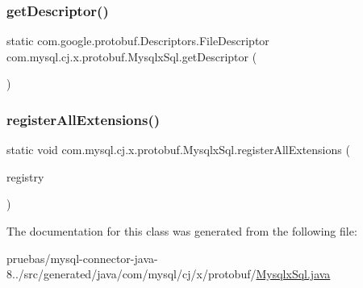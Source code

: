 \subsubsection{\texorpdfstring{get\+Descriptor()}{getDescriptor()}}
{\footnotesize\ttfamily static com.\+google.\+protobuf.\+Descriptors.\+File\+Descriptor com.\+mysql.\+cj.\+x.\+protobuf.\+Mysqlx\+Sql.\+get\+Descriptor (\begin{DoxyParamCaption}{ }\end{DoxyParamCaption})\hspace{0.3cm}{\ttfamily [static]}}

\mbox{\label{classcom_1_1mysql_1_1cj_1_1x_1_1protobuf_1_1_mysqlx_sql_abf06fecb34bc8f5994a1b8f2098c97cf}} 
\subsubsection{\texorpdfstring{register\+All\+Extensions()}{registerAllExtensions()}}
{\footnotesize\ttfamily static void com.\+mysql.\+cj.\+x.\+protobuf.\+Mysqlx\+Sql.\+register\+All\+Extensions (\begin{DoxyParamCaption}\item[{com.\+google.\+protobuf.\+Extension\+Registry}]{registry }\end{DoxyParamCaption})\hspace{0.3cm}{\ttfamily [static]}}



The documentation for this class was generated from the following file\+:\begin{DoxyCompactItemize}
\item 
pruebas/mysql-\/connector-\/java-\/8../src/generated/java/com/mysql/cj/x/protobuf/\mbox{\hyperlink{_mysqlx_sql_8java}{Mysqlx\+Sql.\+java}}\end{DoxyCompactItemize}
